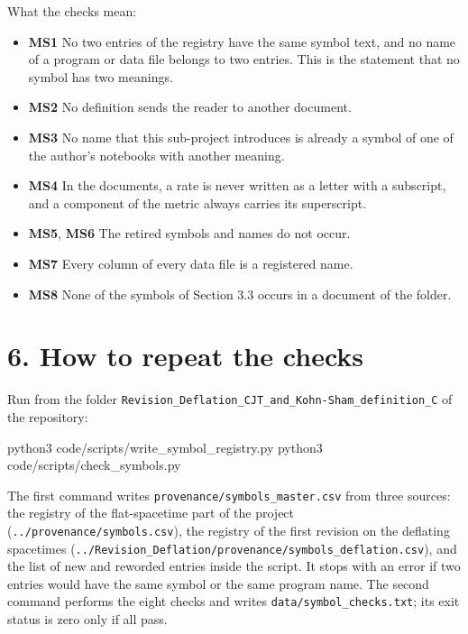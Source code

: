 \documentclass[
  10pt,
]{article}
\newenvironment{Shaded}{}{}
\newcommand{\ExtensionTok}[1]{#1}
\newcommand{\NormalTok}[1]{#1}
\providecommand{\tightlist}{%
  \setlength{\itemsep}{0pt}\setlength{\parskip}{0pt}}
\begin{document}
What the checks mean:

\begin{itemize}
\tightlist
\item
  \textbf{MS1} No two entries of the registry have the same symbol text,
  and no name of a program or data file belongs to two entries. This is
  the statement that no symbol has two meanings.
\item
  \textbf{MS2} No definition sends the reader to another document.
\item
  \textbf{MS3} No name that this sub-project introduces is already a
  symbol of one of the author's notebooks with another meaning.
\item
  \textbf{MS4} In the documents, a rate is never written as a letter
  with a subscript, and a component of the metric always carries its
  superscript.
\item
  \textbf{MS5}, \textbf{MS6} The retired symbols and names do not occur.
\item
  \textbf{MS7} Every column of every data file is a registered name.
\item
  \textbf{MS8} None of the symbols of Section 3.3 occurs in a document
  of the folder.
\end{itemize}

\hypertarget{how-to-repeat-the-checks}{%
\section{6. How to repeat the checks}\label{how-to-repeat-the-checks}}

Run from the folder
\texttt{Revision\_Deflation\_CJT\_and\_Kohn-Sham\_definition\_C} of the
repository:

\begin{Shaded}
\begin{Highlighting}[]
\ExtensionTok{python3}\NormalTok{ code/scripts/write\_symbol\_registry.py}
\ExtensionTok{python3}\NormalTok{ code/scripts/check\_symbols.py}
\end{Highlighting}
\end{Shaded}

The first command writes \texttt{provenance/symbols\_master.csv} from
three sources: the registry of the flat-spacetime part of the project
(\texttt{../provenance/symbols.csv}), the registry of the first revision
on the deflating spacetimes
(\texttt{../Revision\_Deflation/provenance/symbols\_deflation.csv}), and
the list of new and reworded entries inside the script. It stops with an
error if two entries would have the same symbol or the same program
name. The second command performs the eight checks and writes
\texttt{data/symbol\_checks.txt}; its exit status is zero only if all
pass.
\end{document}
